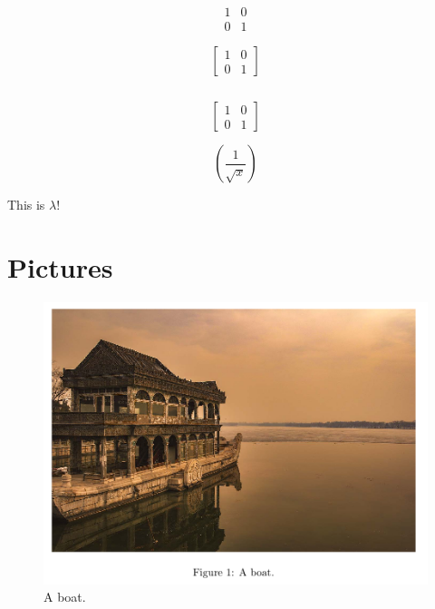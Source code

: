 \documentclass{article}
\begin{document}
    \begin{equation*}
	    \begin{matrix}
		1 & 0\\
		0 & 1
	    \end{matrix}
    \end{equation*}

    \begin{equation*}
	    \begin{bmatrix}
		1 & 0\\
		0 & 1
	    \end{bmatrix}
    \end{equation*}

    \begin{equation*}
	[
	\begin{matrix}
	    1 & 0\\
	    0 & 1
	\end{matrix}
	]
    \end{equation*}

    \begin{equation*}
	\left[
	\begin{matrix}
	    1 & 0\\
	    0 & 1
	\end{matrix}
	\right]
    \end{equation*}

    \begin{equation*}
	\left(\frac{1}{\sqrt{x}}\right)
    \end{equation*}

    This is $\lambda$!

    \newpage

    \section{Pictures}

    \begin{figure}[h!]
	\includegraphics[width=\linewidth]{images/boat.png}
	\caption{A boat.}
	\label{fig:boat1}
    \end{figure}
\end{document}
